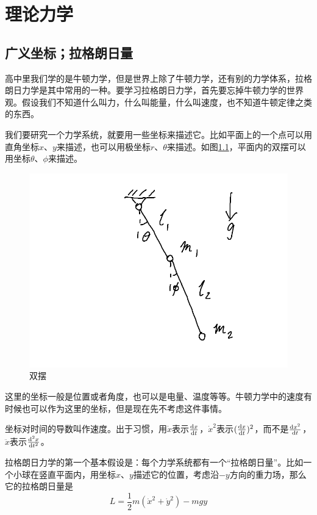 \chapter{理论力学}
\section{广义坐标；拉格朗日量}
高中里我们学的是牛顿力学，但是世界上除了牛顿力学，还有别的力学体系，拉格朗日力学是其中常用的一种。要学习拉格朗日力学，首先要忘掉牛顿力学的世界观。假设我们不知道什么叫力，什么叫能量，什么叫速度，也不知道牛顿定律之类的东西。

我们要研究一个力学系统，就要用一些坐标来描述它。比如平面上的一个点可以用直角坐标$x$、$y$来描述，也可以用极坐标$r$、$\theta$来描述。如图\ref{fig-double-pend}，平面内的双摆可以用坐标$\theta$、$\phi$来描述。
\begin{figure}[htb]
\centering
\includegraphics[scale=0.5]{fig/double-pend}
\caption{双摆}
\label{fig-double-pend}
\end{figure}

这里的坐标一般是位置或者角度，也可以是电量、温度等等。牛顿力学中的速度有时候也可以作为这里的坐标，但是现在先不考虑这件事情。

坐标对时间的导数叫作速度。出于习惯，用$\dot x$表示$\frac{\mathop{}\!\mathrm{d} x}{\mathop{}\!\mathrm{d} t}$，$\dot x^2$表示$(\frac{\mathop{}\!\mathrm{d} x}{\mathop{}\!\mathrm{d} t})^2$，而不是$\frac{\mathop{}\!\mathrm{d} x^2}{\mathop{}\!\mathrm{d} t}$，$\ddot x$表示$\frac{\mathop{}\!\mathrm{d}^2 x}{\mathop{}\!\mathrm{d} t^2}$。

拉格朗日力学的第一个基本假设是：每个力学系统都有一个“拉格朗日量”。比如一个小球在竖直平面内，用坐标$x$、$y$描述它的位置，考虑沿$-y$方向的重力场，那么它的拉格朗日量是
\begin{equation*}
L=\frac{1}{2}m(\dot x^2+\dot y^2)-m g y
\end{equation*}

